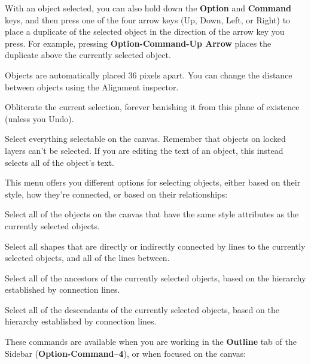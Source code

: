 \documentclass[../main.tex]{subfiles}
\begin{document}
\begin{description}[style=nextline]
    \begin{ogpro}
      With an object selected, you can also hold down the \textbf{Option} and \textbf{Command} keys,
      and then press one of the four arrow keys (Up, Down, Left, or Right) to place a duplicate of
      the selected object in the direction of the arrow key you press. For example, pressing
      \textbf{Option-Command-Up Arrow} places the duplicate above the currently selected object.

      Objects are automatically placed 36 pixels apart. You can change the distance between
      objects using the Alignment inspector.
    \end{ogpro}
  \item[{Delete}] Obliterate the current selection, forever banishing it from this plane of
    existence (unless you Undo).
  \item[{Select All (\textbf{Command-A})}] Select everything selectable on the canvas. Remember
    that objects on locked layers can't be selected. If you are editing the text of an object,
    this instead selects all of the object's text.
  \item[{Select}] This menu offers you different options for selecting objects, either based on
    their style, how they're connected, or based on their relationships:

    \begin{description}[style=nextline]
      \item[{Similar Objects}] Select all of the objects on the canvas that have the same style
        attributes as the currently selected objects.
      \item[{Connected Objects}] Select all shapes that are directly or indirectly connected by
        lines to the currently selected objects, and all of the lines between.
      \item[{Ancestor}] Select all of the ancestors of the currently selected objects, based on
        the hierarchy established by connection lines.
      \item[{Descendants}] Select all of the descendants of the currently selected objects, based
        on the hierarchy established by connection lines.
    \end{description}
  \item[{Outlining}] These commands are available when you are working in the \textbf{Outline}
    tab of the Sidebar (\textbf{Option-Command--4}), or when focused on the canvas:


\end{description}
\end{document}

